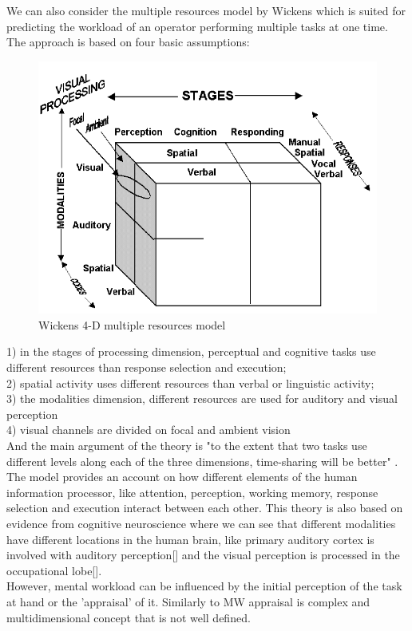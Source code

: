 \documentclass[a4paper]{report}
\begin{document}
			We can also consider the multiple resources model by Wickens\cite{wickens2008multiple,wickens2002multiple} which is suited for predicting the workload of an operator performing multiple tasks at one time. The approach is based on four basic assumptions:\\
				\begin{figure}
					\centering
					\includegraphics[width=0.7\linewidth]{mrt}
					\caption[Multiple resource theory by Wickens]{Wickens 4-D multiple resources model}
					\label{fig:mrt}
				\end{figure}
			1) in the stages of processing dimension, perceptual and cognitive tasks use different resources than response selection and execution;\\
			2) spatial activity uses different resources than verbal or linguistic activity;\\
			3) the modalities dimension, different resources are used for auditory and visual perception\\
			4) visual channels are divided on focal and ambient vision\\
			And the main argument of the theory is "to the extent that two tasks use different levels along each of the three dimensions, time-sharing will be better" \cite{wickens2008multiple}. The model provides an account on how different elements of the human information processor, like attention, perception, working memory, response selection and execution interact between each other. This theory is also based on evidence from cognitive neuroscience where we can see that different modalities have different locations in the human brain, like primary auditory cortex is involved with auditory perception[] and the visual perception is processed in the occupational lobe[].\\
			However, mental workload can be influenced by the initial perception of the task at hand or the 'appraisal' of it. Similarly to MW appraisal is complex and multidimensional concept\cite{folkman1986dynamics,peacock1990stress} that is not well defined.
		
\end{document}
